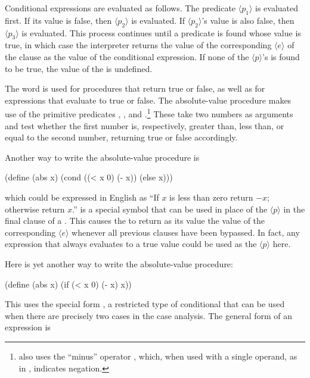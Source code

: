 Conditional expressions are evaluated as follows.  The predicate \( \langle{p_1}\rangle \) is
evaluated first.  If its value is false, then \( \langle{p_2}\rangle \) is evaluated.  If
\( \langle{p_2}\rangle \)'s value is also false, then \( \langle{p_3}\rangle \) is evaluated.  This process
continues until a predicate is found whose value is true, in which case the
interpreter returns the value of the corresponding  \( \langle{e}\rangle \) of the clause as the value of the conditional expression.
If none of the \( \langle{p}\rangle \)'s is found to be true, the value of the  is
undefined.

The word  is used for procedures that return true or false,
as well as for expressions that evaluate to true or false.  The absolute-value
procedure  makes use of the primitive predicates \code{>}, \code{<},
and \code{=}.\footnote{ also uses the ``minus'' operator \code{-},
which, when used with a single operand, as in , indicates
negation.} These take two numbers as arguments and test whether the first
number is, respectively, greater than, less than, or equal to the second
number, returning true or false accordingly.

Another way to write the absolute-value procedure is

\begin{codeBlock}
(define (abs x)
  (cond ((< x 0) (- x))
        (else x)))
\end{codeBlock}

\noindent
which could be expressed in English as ``If \( x \) is less than zero return
\( -x; \) otherwise return \( x \).''   is a special symbol that can be
used in place of the \( \langle{p}\rangle \) in the final clause of a .  This
causes the  to return as its value the value of the corresponding
\( \langle{e}\rangle \) whenever all previous clauses have been bypassed.  In fact, any
expression that always evaluates to a true value could be used as the \( \langle{p}\rangle \)
here.

Here is yet another way to write the absolute-value procedure:

\begin{codeBlock}
(define (abs x)
  (if (< x 0)
      (- x)
      x))
\end{codeBlock}

\noindent
This uses the special form , a restricted type of conditional that can
be used when there are precisely two cases in the case analysis.  The general
form of an  expression is

